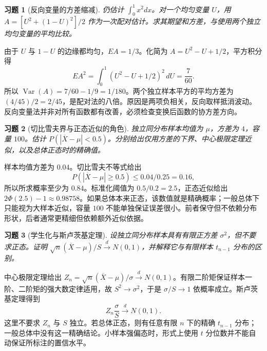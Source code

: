 \documentclass[12pt,fontset=fandol]{ctexart}
\newtheorem{exercise}{习题}[section]
\begin{document}
\begin{exercise}[反向变量的方差缩减]\label{q:B17.18}
仍估计 $\int_0^1x^2dx$。对一个均匀变量 $U$，用 $A=[U^2+(1-U)^2]/2$ 作为一次配对估计。求其期望和方差，与使用两个独立均匀变量的平均比较。\par{}
\end{exercise}

\begin{solve}\label{a:B17.18}由于 $U$ 与 $1-U$ 的边缘都均匀，$EA=1/3$。化简为 $A=U^2-U+1/2$，平方积分得\[EA^2=\int_0^1(U^2-U+1/2)^2\,dU=\frac7{60}.\]所以 $\operatorname{Var}(A)=7/60-1/9=1/180$。两个独立样本平方的平均方差为 $(4/45)/2=2/45$，是配对法的八倍。原因是两项负相关，反向取样抵消波动。反向变量法并非对所有函数都有改善，必须检查变换后函数的协方差方向。\end{solve}

\begin{exercise}[切比雪夫界与正态近似的角色]\label{q:B17.19}
独立同分布样本均值为 $\mu$，方差为 $4$，容量 $100$。估计 $P(|\overline X-\mu|<0.5)$。分别给出仅用方差的下界、中心极限定理近似，以及总体正态时的精确值。\par{}
\end{exercise}

\begin{solve}\label{a:B17.19}样本均值方差为 $0.04$。切比雪夫不等式给出\[P(|\overline X-\mu|\ge0.5)\le0.04/0.25=0.16,\]所以所求概率至少为 $0.84$。标准化阈值为 $0.5/0.2=2.5$，正态近似给出 $2\Phi(2.5)-1\approx0.98758$。如果总体本来正态，该数值就是精确概率；一般总体下只能视为大样本近似，容量 $100$ 不能单独保证误差很小。前者保守但不依赖分布形状，后者通常更精细但依赖额外近似依据。\end{solve}

\begin{exercise}[学生化与斯卢茨基定理]\label{q:B17.20}
设独立同分布样本具有有限正方差 $\sigma^2$，但不要求正态。证明 $\sqrt n(\overline X-\mu)/S\xrightarrow dN(0,1)$，并解释它与有限样本 $t_{n-1}$ 分布的区别。\par{}
\end{exercise}

\begin{solve}\label{a:B17.20}中心极限定理给出 $Z_n=\sqrt n(\overline X-\mu)/\sigma\xrightarrow dN(0,1)$。有限二阶矩保证样本一阶、二阶矩的强大数定律适用，故 $S^2\to\sigma^2$，于是 $\sigma/S\to1$ 依概率成立。斯卢茨基定理得到\[Z_n\frac\sigma S\xrightarrow dN(0,1).\]这里不要求 $Z_n$ 与 $S$ 独立。若总体正态，则有任意有限 $n$ 下的精确 $t_{n-1}$ 分布；一般总体中没有这一精确结论。小样本强偏态时，形式上使用 $t$ 分位数并不能自动保证所标注的置信水平。\end{solve}
\end{document}
